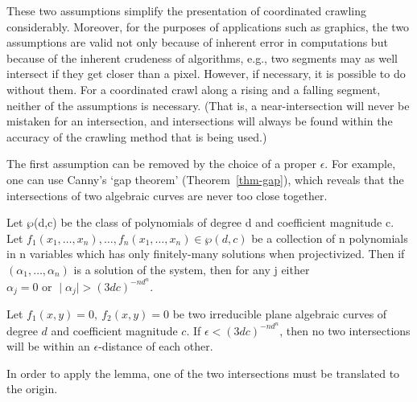 These two assumptions simplify the presentation of coordinated crawling considerably.
Moreover, for the purposes of applications such as graphics,
the two assumptions are valid not only because of inherent error in computations 
but because of the inherent crudeness of algorithms, e.g., two segments may as well 
intersect if they get closer than a pixel.
However, if necessary, it is possible to do without them.
For a coordinated crawl along a rising and a falling segment,
neither of the assumptions is necessary.
(That is, a near-intersection will never be mistaken for an intersection, 
and intersections will always be found within the accuracy 
	of the crawling method that is being used.)
%
%

The first assumption can be removed by the choice of a proper $\epsilon$.
For example, one can use Canny's `gap theorem' (Theorem~\ref{thm-gap}), which 
reveals that the intersections of two algebraic curves are never too close together.

\begin{lemma}
\label{thm-gap}
Let $\wp$(d,c) be the class of polynomials of degree d and coefficient magnitude c.
Let $f_{1}(x_{1},\ldots,x_{n}),\ldots,f_{n}(x_{1},\ldots,x_{n}) \in \wp(d,c)$
be a collection of n polynomials in n variables which has only 
finitely-many solutions when projectivized.
Then if $(\alpha_{1},\ldots,\alpha_{n})$ is a solution of the system,
then for any j either
$\alpha_{j} = 0 \mbox{\ \ \ \ or \ \ \ } \mid \alpha_{j} \mid > (3dc)^{-nd^{n}}$. \QED
\end{lemma}

\begin{corollary}
\label{cor-gap}
Let $f_{1}(x,y) = 0,\ f_{2}(x,y) = 0$ be two irreducible plane algebraic curves of degree 
$d$ and coefficient magnitude $c$.
If $\epsilon < (3dc)^{-nd^{n}}$, then no two intersections will 
be within an $\epsilon$-distance of each other.
\end{corollary}
In order to apply the lemma, one of the two intersections must be translated to the origin.
\QED

